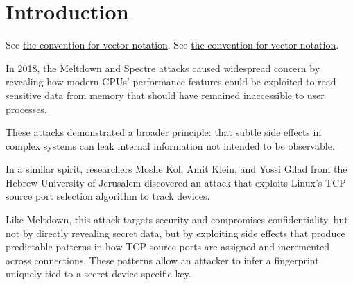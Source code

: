 \documentclass{report}
\begin{document}
\fontsize{8pt}{9pt}\selectfont
{}



\tableofcontents
\thispagestyle{empty}
\clearpage
\pagestyle{plain}

\listoffigures

\clearpage
{}
\pagestyle{default}

\chapter{Introduction}
\label{sec:introduction}

See \hyperref[conv:vector]{the convention for vector notation}.
See \hyperref[conv:real]{the convention for vector notation}.

In 2018, the \alert{Meltdown} and \alert{Spectre} attacks caused widespread concern by revealing how modern CPUs’ performance features could be exploited to read sensitive data from memory that should have remained inaccessible to user processes.

These attacks demonstrated a broader principle: that subtle side effects in complex systems can leak internal information not intended to be observable.

In a similar spirit, researchers Moshe Kol, Amit Klein, and Yossi Gilad from the Hebrew University of Jerusalem discovered an attack that exploits Linux’s \alert{TCP source port selection algorithm} to track devices.

Like Meltdown, this attack targets \alert{security} and compromises confidentiality, but not by directly revealing secret data, but by exploiting side effects that produce predictable patterns in how TCP source ports are assigned and incremented across connections. These patterns allow an attacker to infer a fingerprint uniquely tied to a \alert{secret device-specific key}.
\end{document}
